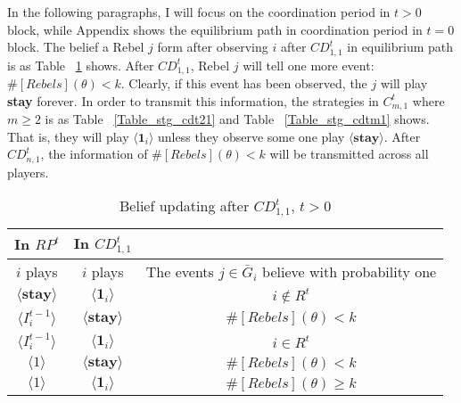 \documentclass[12pt,letter]{article}
\theoremstyle{definition}
\theoremstyle{remark}
\theoremstyle{claim}
\begin{document}
In the following paragraphs, I will focus on the coordination period in $t>0$ block, while Appendix shows the equilibrium path in coordination period in $t=0$ block. The belief a Rebel $j$ form after observing $i$ after $CD^t_{1,1}$ in equilibrium path is as Table ~\ref{Table_blf_up_cdt11} shows. After $CD^t_{1,1}$, Rebel $j$ will tell one more event: $\#[Rebels](\theta)< k$. Clearly, if this event has been observed, the $j$ will play \textbf{stay} forever. In order to transmit this information, the strategies in $C^t_{m,1}$ where $m\geq 2$ is as Table ~\ref{Table_stg_cdt21} and Table ~\ref{Table_stg_cdtm1} shows. That is, they will play $\langle \mathbf{1}_i \rangle$ unless they observe some one play $\langle \textbf{stay} \rangle$. After $CD^t_{n,1}$, the information of $\#[Rebels](\theta)< k$ will be transmitted across all players. 
\begin{table}[t]
\caption{Belief updating after $CD^t_{1,1}$, $t>0$}
\label{Table_blf_up_cdt11}
\begin{center}
\begin{tabular}{c c c}
In $RP^t$ 	&  	In $CD^t_{1,1}$		&  \\
\hline
\hline
$i$ plays 		&  	$i$ plays		& The events $j\in \bar{G}_i$ believe with probability one  \\
\hline
$\langle  \textbf{stay} \rangle$ 	& 	$\langle \mathbf{1}_i \rangle$	    & $i\notin R^t$ \\
$\langle  {I^{t-1}_i} \rangle$ 		&  $\langle \textbf{stay} \rangle$		& $\#[Rebels](\theta)< k$     \\
$\langle  {I^{t-1}_i} \rangle$ 		&  $\langle \mathbf{1}_i \rangle$		& $i\in R^t$     \\
$\langle 1 \rangle$ 		             &  $\langle \textbf{stay} \rangle$		& $\#[Rebels](\theta)< k$  \\
$\langle 1 \rangle$ 		             &  $\langle \mathbf{1}_i \rangle$		&  $\#[Rebels](\theta)\geq k$ 
\end{tabular}
\end{center}
\end{table}
\end{document}
